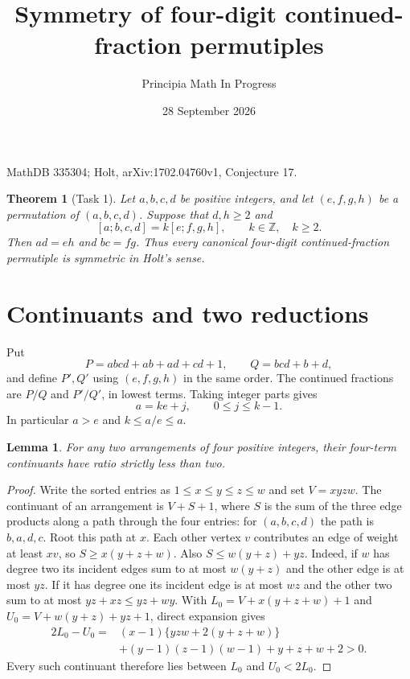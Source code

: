\documentclass[11pt]{article}
\title{Symmetry of four-digit continued-fraction permutiples}
\author{Principia Math In Progress}
\date{28 September 2026}
\newtheorem{theorem}{Theorem}
\newtheorem{lemma}{Lemma}
\begin{document}
\maketitle
\noindent MathDB 335304; Holt, arXiv:1702.04760v1, Conjecture 17.

\begin{theorem}[Task 1]
Let $a,b,c,d$ be positive integers, and let $(e,f,g,h)$ be a
permutation of $(a,b,c,d)$. Suppose that $d,h\ge2$ and
\[
 [a;b,c,d]=k[e;f,g,h],\qquad k\in\mathbb Z,\quad k\ge2.
\]
Then $ad=eh$ and $bc=fg$. Thus every canonical four-digit
continued-fraction permutiple is symmetric in Holt's sense.
\end{theorem}

\section*{Continuants and two reductions}
Put
\[
 P=abcd+ab+ad+cd+1,\qquad Q=bcd+b+d,
\]
and define $P',Q'$ using $(e,f,g,h)$ in the same order.
The continued fractions are $P/Q$ and $P'/Q'$, in lowest terms.
Taking integer parts gives
\begin{equation}\label{floor}
 a=ke+j,\qquad 0\le j\le k-1.
\end{equation}
In particular $a>e$ and $k\le a/e\le a$.

\begin{lemma}\label{ratio}
For any two arrangements of four positive integers,
their four-term continuants have ratio strictly less than two.
\end{lemma}
\begin{proof}
Write the sorted entries as $1\le x\le y\le z\le w$ and set
$V=xyzw$. The continuant of an arrangement is $V+S+1$, where
$S$ is the sum of the three edge products along a path through
the four entries: for $(a,b,c,d)$ the path is $b,a,d,c$.
Root this path at $x$. Each other vertex $v$ contributes an edge
of weight at least $xv$, so $S\ge x(y+z+w)$.
Also $S\le w(y+z)+yz$. Indeed, if $w$ has degree two its incident
edges sum to at most $w(y+z)$ and the other edge is at most $yz$.
If it has degree one its incident edge is at most $wz$ and the
other two sum to at most $yz+xz\le yz+wy$.
With $L_0=V+x(y+z+w)+1$ and $U_0=V+w(y+z)+yz+1$, direct expansion gives
\begin{align*}
2L_0-U_0={}&(x-1)\{yzw+2(y+z+w)\}\\
 &+(y-1)(z-1)(w-1)+y+z+w+2>0.
\end{align*}
Every such continuant therefore lies between $L_0$ and $U_0<2L_0$.
\end{proof}
\end{document}

